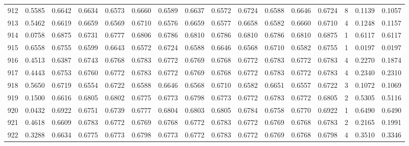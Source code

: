 \begin{tabular}{lrrrrrrrrrrrrrrr}
912 &      0.5585 &  0.6642 &  0.6634 &  0.6573 &  0.6660 &  0.6589 &  0.6637 &  0.6572 &  0.6724 &  0.6588 &   0.6646 &     0.6724 &      8 &                    0.1139 &                     0.1057 \\
913 &      0.5462 &  0.6619 &  0.6659 &  0.6569 &  0.6710 &  0.6576 &  0.6659 &  0.6577 &  0.6658 &  0.6582 &   0.6660 &     0.6710 &      4 &                    0.1248 &                     0.1157 \\
914 &      0.0758 &  0.6875 &  0.6731 &  0.6777 &  0.6806 &  0.6786 &  0.6810 &  0.6786 &  0.6810 &  0.6786 &   0.6810 &     0.6875 &      1 &                    0.6117 &                     0.6117 \\
915 &      0.6558 &  0.6755 &  0.6599 &  0.6643 &  0.6572 &  0.6724 &  0.6588 &  0.6646 &  0.6568 &  0.6710 &   0.6582 &     0.6755 &      1 &                    0.0197 &                     0.0197 \\
916 &      0.4513 &  0.6387 &  0.6743 &  0.6768 &  0.6783 &  0.6772 &  0.6769 &  0.6768 &  0.6772 &  0.6783 &   0.6772 &     0.6783 &      4 &                    0.2270 &                     0.1874 \\
917 &      0.4443 &  0.6753 &  0.6760 &  0.6772 &  0.6783 &  0.6772 &  0.6769 &  0.6768 &  0.6772 &  0.6783 &   0.6772 &     0.6783 &      4 &                    0.2340 &                     0.2310 \\
918 &      0.5650 &  0.6719 &  0.6554 &  0.6722 &  0.6588 &  0.6646 &  0.6568 &  0.6710 &  0.6582 &  0.6651 &   0.6557 &     0.6722 &      3 &                    0.1072 &                     0.1069 \\
919 &      0.1500 &  0.6616 &  0.6805 &  0.6802 &  0.6775 &  0.6773 &  0.6798 &  0.6773 &  0.6772 &  0.6783 &   0.6772 &     0.6805 &      2 &                    0.5305 &                     0.5116 \\
920 &      0.0432 &  0.6922 &  0.6751 &  0.6739 &  0.6777 &  0.6804 &  0.6803 &  0.6805 &  0.6784 &  0.6758 &   0.6770 &     0.6922 &      1 &                    0.6490 &                     0.6490 \\
921 &      0.4618 &  0.6609 &  0.6783 &  0.6772 &  0.6769 &  0.6768 &  0.6772 &  0.6783 &  0.6772 &  0.6769 &   0.6768 &     0.6783 &      2 &                    0.2165 &                     0.1991 \\
922 &      0.3288 &  0.6634 &  0.6775 &  0.6773 &  0.6798 &  0.6773 &  0.6772 &  0.6783 &  0.6772 &  0.6769 &   0.6768 &     0.6798 &      4 &                    0.3510 &                     0.3346 \\

\end{tabular}
